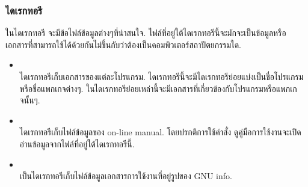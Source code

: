 \begin{thwbr}
\subsubsection{ไดเรกทอรี }
ในไดเรกทอรี  จะมีข้อไฟล์ข้อมูลต่างๆที่น่าสนใจ. ไฟล์ที่อยู่ใต้ไดเรกทอรีนี้จะมักจะเป็นข้อมูลหรือเอกสารที่สามารถใช้ได้ด้วยกันไม่ขึ้นกับว่าต้องเป็นคอมพิวเตอร์สถาปัตยกรรมใด.
\begin{itemize}
\item {}\\
ไดเรกทอรีเก็บเอกสารของแต่ละโปรแกรม. ไดเรกทอรีนี้จะมีไดเรกทอรีย่อยแบ่งเป็นชื่อโปรแกรมหรือชื่อแพกเกจต่างๆ. ในไดเรกทอรีย่อยเหล่านี้จะมีเอกสารที่เกี่ยวข้องกับโปรแกรมหรือแพกเกจนั้นๆ. 
\item {}\\
ไดเรกทอรีเก็บไฟล์ข้อมูลของ on-line manual. โดยปรกติการใช้คำสั่ง  ดูคู่มือการใช้งานจะเปิดอ่านข้อมูลจากไฟล์ที่อยู่ใต้ไดเรกทอรีนี้.
\item {}\\
เป็นไดเรกทอรีเก็บไฟล์ข้อมูลเอกสารการใช้งานที่อยู่รูปของ GNU info.
\end{itemize}


\end{thwbr}
